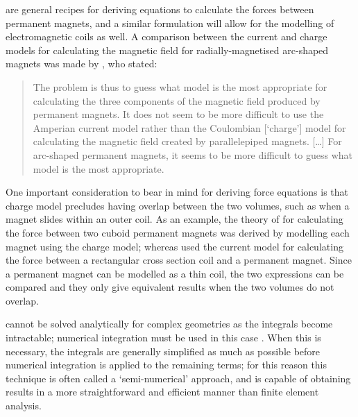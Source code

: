 \documentclass[11pt,a4paper]{memoir}
\begin{document}
 are general recipes for deriving equations to calculate the forces between permanent magnets, and a similar formulation will allow for the modelling of electromagnetic coils as well.
A comparison between the current and charge models for calculating the magnetic field for radially-magnetised arc-shaped magnets was made by \textcite{ravaud2009-pier-compare}, who stated:
\begin{quote}
The problem is thus to guess what model is the most appropriate for calculating the three components of the magnetic field produced by permanent magnets.
It does not seem to be more difficult to use the Amperian current model rather than the Coulombian [`charge'] model for calculating the magnetic field created by parallelepiped magnets. [\dots] For arc-shaped permanent magnets, it seems to be more difficult to guess what model is the most appropriate.
\end{quote}
One important consideration to bear in mind for deriving force equations is that charge model precludes having overlap between the two volumes, such as when a magnet slides within an outer coil.
As an example, the theory of \textcite{akoun1984} for calculating the force between two cuboid permanent magnets was derived by modelling each magnet using the charge model; whereas \textcite{rovers2010-ietm} used the current model for calculating the force between a rectangular cross section coil and a permanent magnet.
Since a permanent magnet can be modelled as a thin coil, the two expressions can be compared and they only give equivalent results when the two volumes do not overlap.

 cannot be solved analytically for complex geometries as the integrals become intractable; numerical integration must be used in this case \cite{charpentier2001}.
When this is necessary, the integrals are generally simplified as much as possible before numerical integration is applied to the remaining terms; for this reason this technique is often called a `semi-numerical' approach, and is capable of obtaining results in a more straightforward and efficient manner than finite element analysis.
\end{document}
